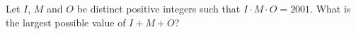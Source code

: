 Let $I$, $M$ and $O$ be distinct positive integers such that $I\cdot M\cdot O=2001$. What is the largest possible value of $I+M+O$?
